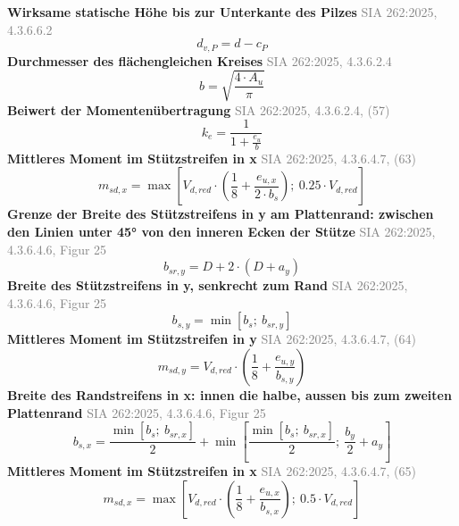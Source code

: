 \documentclass[11pt,a4paper]{article}
\newcommand{\normref}[1]{{\small\textcolor{gray}{#1}}}
\begin{document}
\noindent\textbf{Wirksame statische Höhe bis zur Unterkante des Pilzes} \hfill \normref{SIA 262:2025, 4.3.6.6.2}
\begin{equation*}
d_{v,P} = d - c_P
\end{equation*}
\noindent\textbf{Durchmesser des flächengleichen Kreises} \hfill \normref{SIA 262:2025, 4.3.6.2.4}
\begin{equation*}
b = \sqrt{\frac{4 \cdot A_u}{\pi}}
\end{equation*}
\noindent\textbf{Beiwert der Momentenübertragung} \hfill \normref{SIA 262:2025, 4.3.6.2.4, (57)}
\begin{equation*}
k_e = \frac{1}{1 + \frac{e_u}{b}}
\end{equation*}
\noindent\textbf{Mittleres Moment im Stützstreifen in x} \hfill \normref{SIA 262:2025, 4.3.6.4.7, (63)}
\begin{equation*}
m_{sd,x} = \max\left[V_{d,red} \cdot \left(\frac{1}{8} + \frac{e_{u,x}}{2 \cdot b_s}\right);\ 0.25 \cdot V_{d,red}\right]
\end{equation*}
\noindent\textbf{Grenze der Breite des Stützstreifens in y am Plattenrand: zwischen den Linien unter 45° von den inneren Ecken der Stütze} \hfill \normref{SIA 262:2025, 4.3.6.4.6, Figur 25}
\begin{equation*}
b_{sr,y} = D + 2 \cdot \left(D + a_y\right)
\end{equation*}
\noindent\textbf{Breite des Stützstreifens in y, senkrecht zum Rand} \hfill \normref{SIA 262:2025, 4.3.6.4.6, Figur 25}
\begin{equation*}
b_{s,y} = \min\left[b_s;\ b_{sr,y}\right]
\end{equation*}
\noindent\textbf{Mittleres Moment im Stützstreifen in y} \hfill \normref{SIA 262:2025, 4.3.6.4.7, (64)}
\begin{equation*}
m_{sd,y} = V_{d,red} \cdot \left(\frac{1}{8} + \frac{e_{u,y}}{b_{s,y}}\right)
\end{equation*}
\noindent\textbf{Breite des Randstreifens in x: innen die halbe, aussen bis zum zweiten Plattenrand} \hfill \normref{SIA 262:2025, 4.3.6.4.6, Figur 25}
\begin{equation*}
b_{s,x} = \frac{\min\left[b_s;\ b_{sr,x}\right]}{2} + \min\left[\frac{\min\left[b_s;\ b_{sr,x}\right]}{2};\ \frac{b_y}{2} + a_y\right]
\end{equation*}
\noindent\textbf{Mittleres Moment im Stützstreifen in x} \hfill \normref{SIA 262:2025, 4.3.6.4.7, (65)}
\begin{equation*}
m_{sd,x} = \max\left[V_{d,red} \cdot \left(\frac{1}{8} + \frac{e_{u,x}}{b_{s,x}}\right);\ 0.5 \cdot V_{d,red}\right]
\end{equation*}
\end{document}
